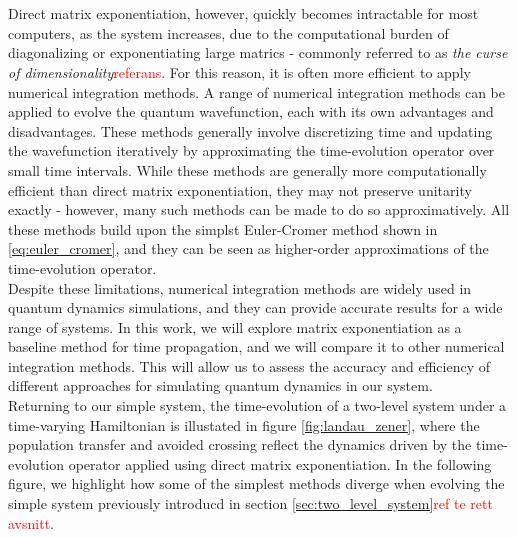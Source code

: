 \documentclass{subfiles}
\begin{document}
\\\\ Direct matrix exponentiation, however, quickly becomes intractable for most computers, as the system increases, due to the computational burden of diagonalizing or exponentiating large matrics - commonly referred to as \emph{the curse of dimensionality}\textcolor{red}{referans}. For this reason, it is often more efficient to apply numerical integration methods. A range of numerical integration methods can be applied to evolve the quantum wavefunction, each with its own advantages and disadvantages. These methods generally involve discretizing time and updating the wavefunction iteratively by approximating the time-evolution operator over small time intervals. While these methods are generally more computationally efficient than direct matrix exponentiation, they may not preserve unitarity exactly - however, many such methods can be made to do so approximatively. All these methods build upon the simplst Euler-Cromer method shown in \eqref{eq:euler_cromer}, and they can be seen as higher-order approximations of the time-evolution operator. 
\\ Despite these limitations, numerical integration methods are widely used in quantum dynamics simulations, and they can provide accurate results for a wide range of systems. In this work, we will explore matrix exponentiation as a baseline method for time propagation, and we will compare it to other numerical integration methods. This will allow us to assess the accuracy and efficiency of different approaches for simulating quantum dynamics in our system. \\ Returning to our simple system, the time-evolution of a two-level system under a time-varying Hamiltonian is illustated in figure \ref{fig:landau_zener}, where the population transfer and avoided crossing reflect the dynamics driven by the time-evolution operator applied using direct matrix exponentiation. In the following figure, we highlight how some of the simplest methods diverge when evolving the simple system previously introducd in section \ref{sec:two_level_system}\textcolor{red}{ref te rett avsnitt}.
\end{document}

